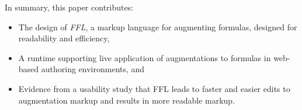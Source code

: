 In summary, this paper contributes:
\begin{itemize}
\item The design of \emph{FFL}, a markup language for augmenting formulas, designed for readability and efficiency,
\item A runtime supporting live application of augmentations to formulas in web-based authoring environments, and
\item Evidence from a usability study that FFL leads to faster and easier edits to augmentation markup and results in more readable markup.
\end{itemize}
